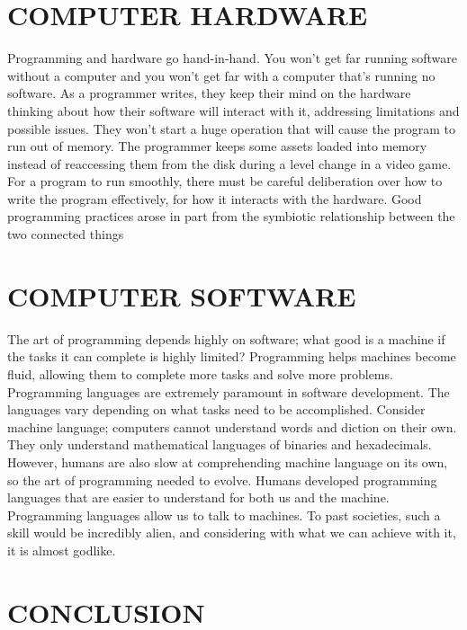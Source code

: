 \documentclass[letterpaper, 10 pt, conference]{IEEEconf}
\begin{document}
\section{COMPUTER HARDWARE}


Programming and hardware go hand-in-hand. You won’t get far running software without a computer
and you won’t get far with a computer that’s running no software. 
As a programmer writes, they keep their mind on the hardware thinking about how their software
will interact with it, addressing limitations and possible issues. They won’t start a huge
operation that will cause the program to run out of memory. The programmer keeps some assets
loaded into memory instead of reaccessing them from the disk during a level change in a video
game. For a program to run smoothly, there must be careful deliberation over how to write the
program effectively, for how it interacts with  the hardware. 
Good programming practices arose in part from the symbiotic relationship between the two
connected things

\section{COMPUTER SOFTWARE}

The art of programming depends highly on software; what good is a machine if the tasks it can complete is highly limited? Programming helps machines become fluid, allowing them to complete more tasks and solve more problems. Programming languages are extremely paramount in software development. The languages vary depending on what tasks need to be accomplished. Consider machine language; computers cannot understand words and diction on their own. They only understand mathematical languages of binaries and hexadecimals. However, humans are also slow at comprehending machine language on its own, so the art of programming needed to evolve. Humans developed programming languages that are easier to understand for both us and the machine. Programming languages allow us to talk to machines. To past societies, such a skill would be incredibly alien, and considering with what we can achieve with it, it is almost godlike. 

\section{CONCLUSION}
\end{document}
